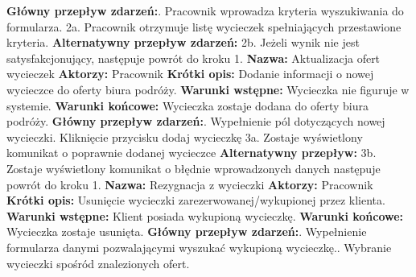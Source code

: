 \documentclass[polish,polish,a4paper]{article}
\begin{document}
\textbf{Główny przepływ zdarzeń:}. Pracownik wprowadza kryteria wyszukiwania do formularza.\newline
2a. Pracownik otrzymuje listę wycieczek spełniających przestawione kryteria.\newline
\textbf{Alternatywny przepływ zdarzeń:}\newline
2b. Jeżeli wynik nie jest satysfakcjonujący, następuje powrót do kroku 1.\newline
\newline
\textbf{Nazwa:} Aktualizacja ofert wycieczek\newline
\textbf{Aktorzy:} Pracownik\newline
\textbf{Krótki opis:} Dodanie informacji o nowej wycieczce do oferty biura podróży.\newline
\textbf{Warunki wstępne:} Wycieczka nie figuruje w systemie.\newline
\textbf{Warunki końcowe:} Wycieczka zostaje dodana do oferty biura podróży.\newline
\textbf{Główny przepływ zdarzeń:}. Wypełnienie pól dotyczących nowej wycieczki. Kliknięcie przycisku dodaj wycieczkę\newline
3a. Zostaje wyświetlony komunikat o poprawnie dodanej wycieczce\newline
\textbf{Alternatywny przepływ:}\newline
3b. Zostaje wyświetlony komunikat o błędnie wprowadzonych danych następuje powrót do\newline
kroku 1.\newline
\newline
\textbf{Nazwa:} Rezygnacja z wycieczki\newline
\textbf{Aktorzy:} Pracownik\newline
\textbf{Krótki opis:} Usunięcie wycieczki zarezerwowanej/wykupionej przez klienta.\newline
\textbf{Warunki wstępne:} Klient posiada wykupioną wycieczkę.\newline
\textbf{Warunki końcowe:} Wycieczka zostaje usunięta.\newline
\textbf{Główny przepływ zdarzeń:}. Wypełnienie formularza danymi pozwalającymi wyszukać wykupioną wycieczkę.. Wybranie wycieczki spośród znalezionych ofert.\newline
\end{document}
